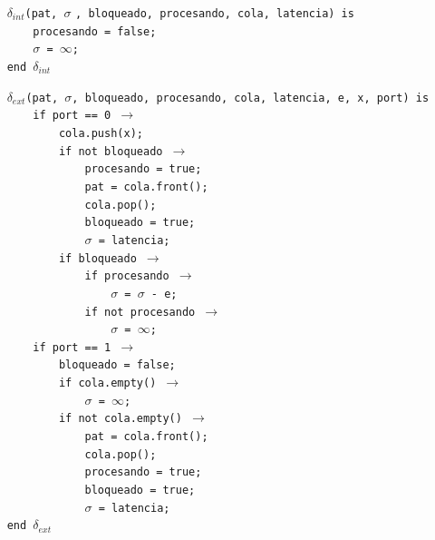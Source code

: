 \documentclass[12pt]{article}
\begin{document}
\begin{tcolorbox}[
    colback=black!5!white,
    colframe=black!80!white,
    boxrule=0.8pt,
    arc=2pt,
    left=5pt,
    right=5pt,
    top=5pt,
    bottom=5pt,
    fontupper=\ttfamily,
    breakable
]
\begin{flushleft}
\texttt{~~~~}$\delta_{int}$\texttt{(pat, }$\sigma$ \texttt{, bloqueado, procesando, cola, latencia) is} \\
\texttt{~~~~~~~~procesando = false;} \\
\texttt{~~~~~~~~}$\sigma$\texttt{ = }\(\infty\)\texttt{;} \\
\texttt{~~~~end }$\delta_{int}$
\end{flushleft}

\begin{flushleft}
\texttt{~~~~}$\delta_{ext}$\texttt{(pat, }$\sigma$\texttt{, bloqueado, procesando, cola, latencia, e, x, port) is} \\
\texttt{~~~~~~~~if port == 0 }\(\rightarrow\) \\
\texttt{~~~~~~~~~~~~cola.push(x);} \\
\texttt{~~~~~~~~~~~~if not bloqueado }\(\rightarrow\) \\
\texttt{~~~~~~~~~~~~~~~~procesando = true;} \\
\texttt{~~~~~~~~~~~~~~~~pat = cola.front();} \\
\texttt{~~~~~~~~~~~~~~~~cola.pop();} \\
\texttt{~~~~~~~~~~~~~~~~bloqueado = true;} \\
\texttt{~~~~~~~~~~~~~~~~}$\sigma$\texttt{ = latencia;} \\
\texttt{~~~~~~~~~~~~if bloqueado }\(\rightarrow\) \\
\texttt{~~~~~~~~~~~~~~~~if procesando }\(\rightarrow\) \\
\texttt{~~~~~~~~~~~~~~~~~~~~}$\sigma$\texttt{ = }$\sigma$\texttt{ - e;} \\
\texttt{~~~~~~~~~~~~~~~~if not procesando }\(\rightarrow\) \\
\texttt{~~~~~~~~~~~~~~~~~~~~}$\sigma$\texttt{ = }\(\infty\)\texttt{;} \\[5pt]

\texttt{~~~~~~~~if port == 1 }\(\rightarrow\) \\
\texttt{~~~~~~~~~~~~bloqueado = false;} \\
\texttt{~~~~~~~~~~~~if cola.empty() }\(\rightarrow\) \\
\texttt{~~~~~~~~~~~~~~~~}$\sigma$\texttt{ = }\(\infty\)\texttt{;} \\
\texttt{~~~~~~~~~~~~if not cola.empty() }\(\rightarrow\) \\
\texttt{~~~~~~~~~~~~~~~~pat = cola.front();} \\
\texttt{~~~~~~~~~~~~~~~~cola.pop();} \\
\texttt{~~~~~~~~~~~~~~~~procesando = true;} \\
\texttt{~~~~~~~~~~~~~~~~bloqueado = true;} \\
\texttt{~~~~~~~~~~~~~~~~}$\sigma$\texttt{ = latencia;} \\
\texttt{~~~~end }$\delta_{ext}$
\end{flushleft}


\end{tcolorbox}
\end{document}
